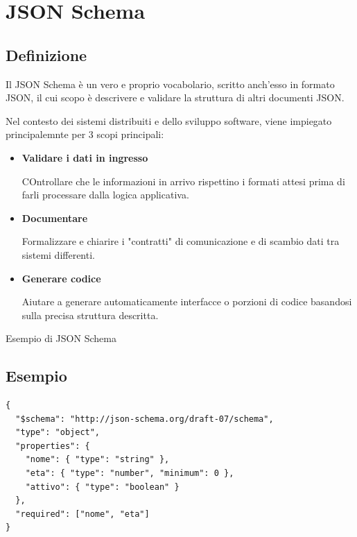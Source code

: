 \section{JSON Schema}
\subsection{Definizione}
Il JSON Schema è un vero e proprio vocabolario, scritto anch'esso in formato JSON, il cui scopo è descrivere e validare la struttura di altri documenti JSON.

Nel contesto dei sistemi distribuiti e dello sviluppo software, viene impiegato principalemnte per 3 scopi principali:
\begin{itemize}
    \item \textbf{Validare i dati in ingresso}

    COntrollare che le informazioni in arrivo rispettino i formati attesi prima di farli processare dalla logica applicativa.
    \item \textbf{Documentare}

    Formalizzare e chiarire i "contratti" di comunicazione e di scambio dati tra sistemi differenti.
    \item \textbf{Generare codice}

    Aiutare a generare automaticamente interfacce o porzioni di codice basandosi sulla precisa struttura descritta.
\end{itemize}
\begin{tcolorbox}{Esempio di JSON Schema}
\subsection{Esempio}
\begin{lstlisting}
{
  "$schema": "http://json-schema.org/draft-07/schema",
  "type": "object",
  "properties": {
    "nome": { "type": "string" },
    "eta": { "type": "number", "minimum": 0 },
    "attivo": { "type": "boolean" }
  },
  "required": ["nome", "eta"]
}
\end{lstlisting}
\end{tcolorbox}